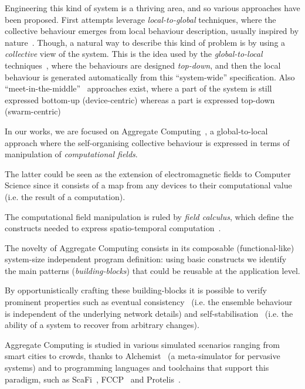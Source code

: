 \documentclass[conference]{IEEEtran}
\begin{document}
Engineering this kind of system is a thriving area, and so various approaches have been proposed.
 First attempts leverage \textit{local-to-global} techniques, where the collective behaviour emerges from local behaviour description, 
 usually inspired by nature~\cite{DBLP:journals/swarm/BrambillaFBD13}. 
%
Though, a natural way to describe this kind of problem is by using a \textit{collective} view of the system.
 This is the idea used by the \textit{global-to-local} techniques~\cite{DBLP:journals/jlap/ViroliBDACP19,DBLP:journals/scp/AlrahmanNL20, DBLP:conf/cbse/BuresGHKKP13}, 
 where the behaviours are designed \textit{top-down}, and then the local behaviour is generated automatically from this ``system-wide'' specification. 
% 
Also ``meet-in-the-middle''~\cite{DBLP:journals/computer/PinciroliB16} approaches exist, where
 a part of the system is still expressed bottom-up (device-centric) whereas a part is expressed top-down (swarm-centric)

In our works, we are focused on Aggregate Computing~\cite{DBLP:journals/computer/BealPV15}, a global-to-local approach where
 the self-organising collective behaviour is expressed in terms of manipulation of \textit{computational fields}.

The latter could be seen as the extension of electromagnetic fields to Computer Science since it consists of a 
 map from any devices to their computational value (i.e. the result of a computation).

The computational field manipulation is ruled by \textit{field calculus}, which define the constructs needed 
 to express spatio-temporal computation~\cite{DBLP:conf/coordination/AudritoBDV18}.

The novelty of Aggregate Computing consists in its composable (functional-like) system-size independent program definition: 
using basic constructs we identify the main patterns (\textit{building-blocks}) that could be reusable at the application level.

By opportunistically crafting these building-blocks it is possible to verify prominent properties such as eventual consistency~\cite{DBLP:journals/taas/BealVPD17} 
 (i.e. the ensemble behaviour is independent of the underlying network details)
 and self-stabilisation~\cite{DBLP:journals/tomacs/ViroliABDP18} (i.e. the ability of a system to recover from arbitrary changes).

Aggregate Computing is studied in various simulated scenarios ranging from smart cities to crowds, 
 thanks to Alchemist~\cite{DBLP:journals/jos/PianiniMV13} (a meta-simulator for pervasive systems) and to programming languages and toolchains that support 
 this paradigm, such as ScaFi~\cite{DBLP:conf/ecoop/CasadeiV16}, FCCP~\cite{DBLP:conf/acsos/Audrito20} and Protelis~\cite{PianiniSAC2015}.
\end{document}

